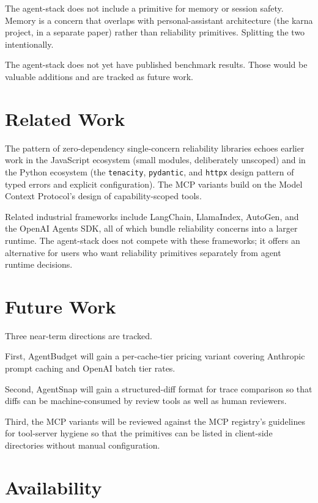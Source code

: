 \documentclass[11pt]{article}
\begin{document}
The agent-stack does not include a primitive for memory or session safety. Memory is a concern that overlaps with personal-assistant architecture (the karna project, in a separate paper) rather than reliability primitives. Splitting the two intentionally.

The agent-stack does not yet have published benchmark results. Those would be valuable additions and are tracked as future work.

\section{Related Work}


The pattern of zero-dependency single-concern reliability libraries echoes earlier work in the JavaScript ecosystem (small modules, deliberately unscoped) and in the Python ecosystem (the \texttt{tenacity}, \texttt{pydantic}, and \texttt{httpx} design pattern of typed errors and explicit configuration). The MCP variants build on the Model Context Protocol's design of capability-scoped tools.

Related industrial frameworks include LangChain, LlamaIndex, AutoGen, and the OpenAI Agents SDK, all of which bundle reliability concerns into a larger runtime. The agent-stack does not compete with these frameworks; it offers an alternative for users who want reliability primitives separately from agent runtime decisions.

\section{Future Work}


Three near-term directions are tracked.

First, AgentBudget will gain a per-cache-tier pricing variant covering Anthropic prompt caching and OpenAI batch tier rates.

Second, AgentSnap will gain a structured-diff format for trace comparison so that diffs can be machine-consumed by review tools as well as human reviewers.

Third, the MCP variants will be reviewed against the MCP registry's guidelines for tool-server hygiene so that the primitives can be listed in client-side directories without manual configuration.

\section{Availability}
\end{document}

